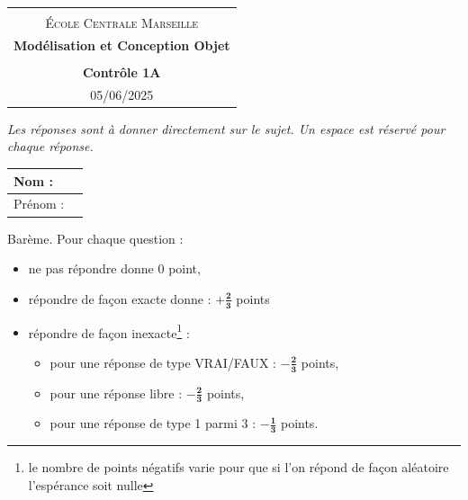 \documentclass[12pt]{article}
\begin{document}
\begin{center}
  \begin{tabular}{c}
  \hline\\%
  {\textsc{\'Ecole Centrale Marseille}}\vspace{0.1cm}
  \\

    {\bf {\Large Modélisation et Conception Objet}}\\%
    \\
    {\bf  { Contrôle 1A }}\\
    {\footnotesize 05/06/2025}\\
    \hline
  \end{tabular}
\end{center}
\vspace{0.6cm}

\noindent
{\em Les réponses sont à donner directement sur le sujet. Un espace est réservé pour chaque réponse.}

\vspace*{1cm}
\noindent
\begin{tabular}{|l|p{10cm}|}
    \hline
    Nom : & \\
    \hline
    Prénom : & \\
    \hline
    
\end{tabular}


\vspace*{2cm}
\noindent
Barème. Pour chaque question : 
\begin{itemize}
    \item ne pas répondre donne 0 point,
    \item répondre de façon exacte donne : $\mathbf{+\frac{2}{3}}$ points
    \item répondre de façon inexacte\footnote{le nombre de points négatifs varie pour que si l'on répond de façon aléatoire l'espérance soit nulle} : 
    \begin{itemize}
        \item pour une réponse de type VRAI/FAUX : $\mathbf{-\frac{2}{3}}$ points,
        \item pour une réponse libre : $\mathbf{-\frac{2}{3}}$ points,
        \item pour une réponse de type 1 parmi 3 : $\mathbf{-\frac{1}{3}}$ points.
    \end{itemize}
\end{itemize}
\newpage
\end{document}
